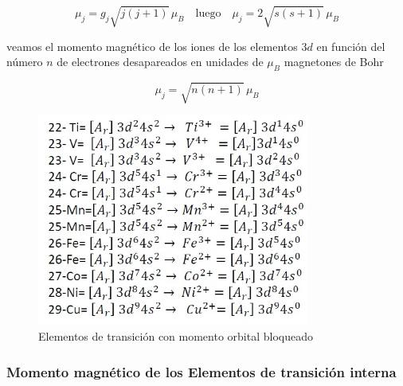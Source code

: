 \begin{equation}
	\mu_{j} = g_{j}\sqrt{j(j+1)}\,\mu_{B} \quad \text{luego} \quad \mu_{j}=2\sqrt{s(s+1)}\,\mu_{B}
\end{equation}

veamos el momento magnético de los iones de los elementos $3d$ en función del número $n$ de electrones
desapareados en unidades de $\mu_{B}$ magnetones de Bohr

\begin{equation}
	\mu_{j} = \sqrt{n(n+1)}\,\mu_{B} 
\end{equation}

\begin{figure}[H]
    \centering
    \includegraphics[width=0.8\textwidth]{./Figures/momMagElemTransicion3}
	\caption{Elementos de transición con momento orbital bloqueado}
	\label{fig:momMagElemTransicion3}
\end{figure}

\subsubsection{Momento magnético de los Elementos de transición interna}

